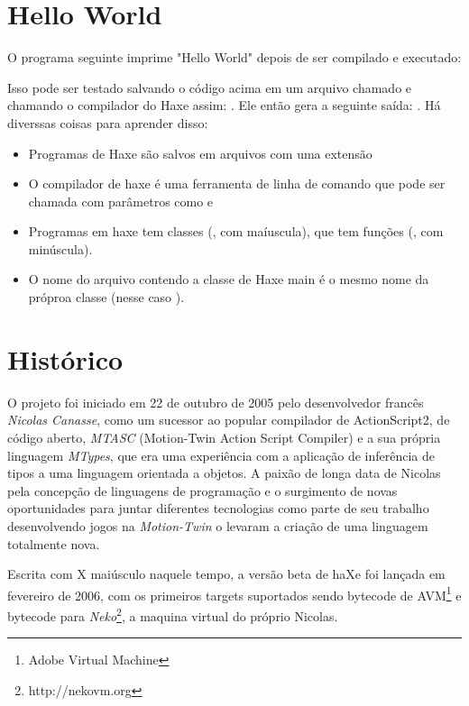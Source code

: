 \section{Hello World}
\label{introduction-hello-world}

O programa seguinte imprime "Hello World" depois de ser compilado e executado:


Isso pode ser testado salvando o código acima em um arquivo chamado  e chamando o compilador do Haxe assim: . Ele então gera a seguinte saída: . Há diverssas coisas para aprender disso:

\begin{itemize}
	\item Programas de Haxe são salvos em arquivos com uma extensão 
	\item O compilador de haxe é uma ferramenta de linha de comando que pode ser chamada com parâmetros como  e 
	\item Programas em haxe tem classes (, com maíuscula), que tem funções (, com minúscula).
	\item O nome do arquivo contendo a classe de Haxe main é o mesmo nome da próproa classe (nesse caso ).
\end{itemize}

\section{Histórico}
\label{introduction-haxe-history}

O projeto foi iniciado em 22 de outubro de 2005 pelo desenvolvedor francês \emph{Nicolas Canasse}, como um sucessor ao popular compilador de ActionScript2, de código aberto, \emph{MTASC} (Motion-Twin Action Script Compiler) e a sua própria linguagem \emph{MTypes}, que era uma experiência com a aplicação de inferência de tipos a uma linguagem orientada a objetos. A paixão de longa data de Nicolas pela concepção de linguagens de programação e o surgimento de novas oportunidades para juntar diferentes tecnologias como parte de seu trabalho desenvolvendo jogos na \emph{Motion-Twin} o levaram a criação de uma linguagem totalmente nova.

Escrita com X maiúsculo naquele tempo, a versão beta de haXe foi lançada em fevereiro de 2006, com os primeiros targets suportados sendo bytecode de AVM\footnote{Adobe Virtual Machine} e bytecode para \emph{Neko}\footnote{http://nekovm.org}, a maquina virtual do próprio Nicolas.

